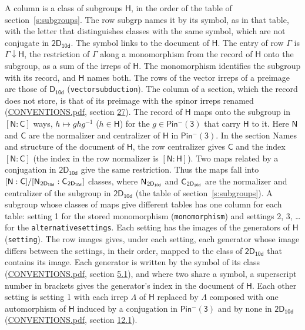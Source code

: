 \documentclass[10pt,a4paper]{article}
\numberwithin{equation}{section}
\newcommand{\grp}[1]{\mathsf{#1}}
\newcommand{\grpindex}[2]{[#1 : #2]}
\newcommand{\restr}[2]{#1\!\downarrow#2}
\newcommand{\hairsp}{\mkern1mu}
\begin{document}
A column is a class of subgroups $\grp{H}$, in the order of the table of section~\ref{s:subgroups}. The row subgrp names it by its symbol, as in that table, with the letter that distinguishes classes with the same symbol, which are not conjugate in $\grp{2D_{10d}}$. The symbol links to the document of $\grp{H}$. The entry of row $\Gamma$ is $\restr{\Gamma}{\grp{H}}$, the restriction of $\Gamma$ along a monomorphism from the record of $\grp{H}$ onto the subgroup, as a sum of the irreps of $\grp{H}$. The monomorphism identifies the subgroup with its record, and $\grp{H}$ names both. The rows of the vector irreps of a preimage are those of \href{../../../rotation/data/pdf/D10d.pdf}{$\grp{D_{10d}}$} (\texttt{vectorsubduction}). The column of a section, which the record does not store, is that of its preimage with the spinor irreps renamed (\href{../../CONVENTIONS.pdf}{CONVENTIONS.pdf}, section \href{../../CONVENTIONS.pdf\#conv.27}{27}). \label{n:group.normalizer.o3}\label{n:group.centralizer.o3}\label{n:element.h}The record of $\grp{H}$ maps onto the subgroup in $\grpindex{\grp{N}}{\grp{C}}$ ways, $h \mapsto g h g^{-1}$ ($h \in \grp{H}$) for the $g \in \grp{Pin^{-}(3)}$ that carry $\grp{H}$ to it. Here $\grp{N}$ and $\grp{C}$ are the normalizer and centralizer of $\grp{H}$ in \href{Pinminus3.pdf}{$\grp{Pin^{-}(3)}$}. In the section Names and structure of the document of $\grp{H}$, the row centralizer gives $\grp{C}$ and the index $\grpindex{\grp{N}}{\grp{C}}$ (the index in the row normalizer is $\grpindex{\grp{N}}{\grp{H}}$). Two maps related by a conjugation in $\grp{2D_{10d}}$ give the same restriction. Thus the maps fall into $\grpindex{\grp{N}}{\grp{C}}/\grpindex{\grp{N}_{\hairsp \grp{2D_{10d}}}}{\grp{C}_{\hairsp \grp{2D_{10d}}}}$ classes, where $\grp{N}_{\hairsp \grp{2D_{10d}}}$ and $\grp{C}_{\hairsp \grp{2D_{10d}}}$ are the normalizer and centralizer of the subgroup in $\grp{2D_{10d}}$ (the table of section~\ref{s:subgroups}). \label{n:head.setting}A subgroup whose classes of maps give different tables has one column for each table: setting 1 for the stored monomorphism (\texttt{monomorphism}) and settings 2, 3, \dots{} for the \texttt{alternativesettings}. Each setting has the images of the generators of $\grp{H}$ (\texttt{setting}). \label{n:head.images}The row images gives, under each setting, each generator whose image differs between the settings, in their order, mapped to the class of $\grp{2D_{10d}}$ that contains its image. \label{n:element.generator.index}Each generator is written by the symbol of its class (\href{../../CONVENTIONS.pdf}{CONVENTIONS.pdf}, section \href{../../../rotation/CONVENTIONS.pdf\#conv.5.1}{5.1}), and where two share a symbol, a superscript number in brackets gives the generator's index in the document of $\grp{H}$. \label{n:irrep.Delta}Each other setting is setting 1 with each irrep $\Lambda$ of $\grp{H}$ replaced by $\Lambda$ composed with one automorphism of $\grp{H}$ induced by a conjugation in \href{Pinminus3.pdf}{$\grp{Pin^{-}(3)}$} and by none in $\grp{2D_{10d}}$ (\href{../../CONVENTIONS.pdf}{CONVENTIONS.pdf}, section \href{../../../rotation/CONVENTIONS.pdf\#conv.12.1}{12.1}).
\end{document}
